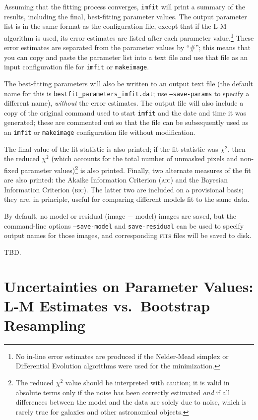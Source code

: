 \documentclass[10pt,a4paper,article]{memoir}
\newcommand{\imfit}{\texttt{imfit}}
\newcommand{\makeimage}{\texttt{makeimage}}
\newcommand{\chisquare}{\ensuremath{\chi^{2}}}
\begin{document}
Assuming that the fitting process converges, \imfit{} will print a
summary of the results, including the final, best-fitting parameter
values. The output parameter list is in the same format as the
configuration file, except that if the L-M algorithm is used, its error
estimates are listed after each parameter value.\footnote{No in-line
error estimates are produced if the Nelder-Mead simplex or Differential
Evolution algorithms were used for the minimization.} These error
estimates are separated from the parameter values by ``\#''; this means
that you can copy and paste the parameter list into a text file and use
that file as an input configuration file for \imfit{} or \makeimage. 

The best-fitting parameters will also be written to an output text file (the default
name for this is \texttt{bestfit\_parameters\_imfit.dat}; use \texttt{--save-params} to
specify a different name), \textit{without} the error estimates. The output file
will also include a copy of the original command used to start \imfit{} and the
date and time it was generated; these are commented out so that the file can be
subsequently used as an \imfit{} or \makeimage{} configuration file without
modification.

The final value of the fit statistic is also printed; if the fit
statistic was \chisquare, then  the reduced $\chi^{2}$ (which accounts
for the total number of unmasked pixels and non-fixed parameter
values)\footnote{The reduced $\chi^{2}$ value should be interpreted with
caution; it is valid in absolute terms only if the noise has been
correctly estimated \textit{and} if all differences between the model
and the data are solely due to noise, which is rarely true for galaxies
and other astronomical objects.} is also printed. Finally, two alternate
measures of the fit are also printed: the Akaike Information Criterion
(\textsc{aic}) and the Bayesian Information Criterion (\textsc{bic}).
The latter two are included on a provisional basis; they are, in
principle, useful for comparing different models fit to the same data.

By default, no model or residual (image $-$ model) images are saved, but
the command-line options \texttt{--save-model} and
\texttt{save-residual} can be used to specify output names for those
images, and corresponding \textsc{fits} files will be saved to disk.

TBD.

\section{Uncertainties on Parameter Values: L-M Estimates vs.\ Bootstrap Resampling}
\label{sec:bootstrap}
\end{document}
